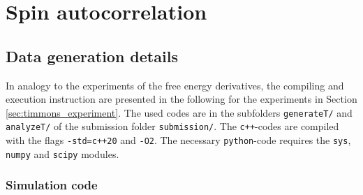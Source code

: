 \chapter{Spin autocorrelation}

\section{Data generation details}

In analogy to the experiments of the free energy derivatives, the compiling and execution instruction are presented in the following for the experiments
in Section \ref{sec:timmons_experiment}. The used codes are in the subfolders \verb|generateT/| and \verb|analyzeT/| of the submission folder 
\verb|submission/|. The \verb|c++|-codes are compiled with the flags \verb|-std=c++20| and \verb|-O2|. The necessary \verb|python|-code requires 
the \verb|sys|, \verb|numpy| and \verb|scipy| modules. 

\subsection*{Simulation code}

